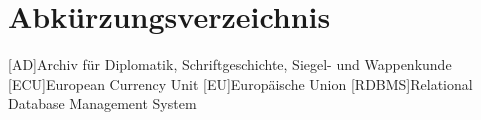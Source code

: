 \clearpage
\chapter*{Abkürzungsverzeichnis}	

\begin{acronym}[XXXXXXX]
	[AD]{Archiv für Diplomatik, Schriftgeschichte, Siegel- und Wappenkunde}
	[ECU]{European Currency Unit}
	[EU]{Europäische Union}
	[RDBMS]{Relational Database Management System}
\end{acronym}